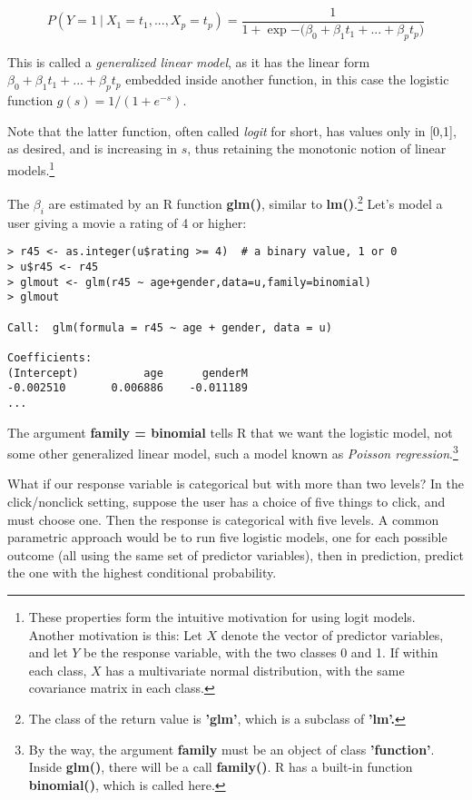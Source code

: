 \begin{equation}
P(Y  = 1 ~|~ X_1=t_1,...,X_p=t_p) =
\frac{1}{1+\exp{-(\beta_0+\beta_1 t_1+...+\beta_p t_p})}
\end{equation}

This is called a \textit{generalized linear model}, as it has the linear
form $\beta_0+\beta_1 t_1+...+\beta_p t_p$ embedded inside
another function, in this case the logistic function $g(s) =
1/(1+e^{-s})$.

Note that the latter function, often called \textit{logit} for short,
has values only in [0,1], as desired, and is increasing in $s$, thus
retaining the monotonic notion of linear models.\footnote{These
properties form the intuitive motivation for using logit models.
Another motivation is this: Let $X$ denote the vector of predictor
variables, and let $Y$ be the response variable, with the two classes 0
and 1.  If within each class, $X$ has a multivariate normal
distribution, with the same covariance matrix in each class.}

The $\beta_i$ are estimated by an R function \textbf{glm()}, similar to
\textbf{lm()}.\footnote{The class of the return value is \textbf{'glm'},
which is a subclass of \textbf{'lm'.}
}
Let's model a user giving a movie a rating of 4 or
higher:

\begin{lstlisting}
> r45 <- as.integer(u$rating >= 4)  # a binary value, 1 or 0
> u$r45 <- r45
> glmout <- glm(r45 ~ age+gender,data=u,family=binomial)
> glmout

Call:  glm(formula = r45 ~ age + gender, data = u)

Coefficients:
(Intercept)          age      genderM  
-0.002510       0.006886    -0.011189  
...
\end{lstlisting}

The argument \textbf{family = binomial} tells R that we want the
logistic model, not some other generalized linear model, such a model
known as \textit{Poisson regression}.\footnote{By the way, the argument
\textbf{family} must be an object of class \textbf{'function'}.  Inside
\textbf{glm()}, there will be a call \textbf{family()}.  R has a
built-in function \textbf{binomial()}, which is called here.}

What if our response variable is categorical but with more than two
levels?  In the click/nonclick setting, suppose the user has a choice of
five things to click, and must choose one.  Then the response is
categorical with five levels.  A common parametric approach would be to
run five logistic models, one for each possible outcome (all using the
same set of predictor variables), then in prediction, predict the one
with the highest conditional probability.


